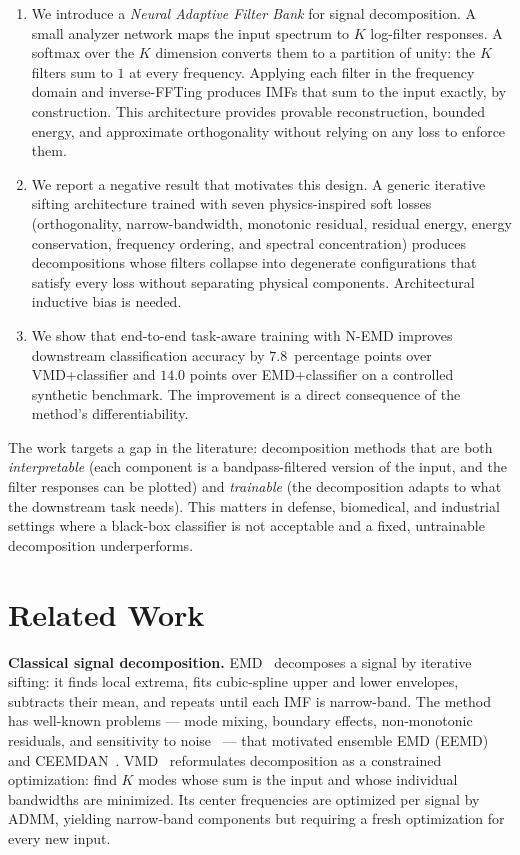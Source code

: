 \documentclass[journal]{IEEEtran}
\begin{document}
\begin{enumerate}
\item We introduce a \emph{Neural Adaptive Filter Bank} for signal decomposition. A small analyzer network maps the input spectrum to $K$ log-filter responses. A softmax over the $K$ dimension converts them to a partition of unity: the $K$ filters sum to $1$ at every frequency. Applying each filter in the frequency domain and inverse-FFTing produces IMFs that sum to the input exactly, by construction. This architecture provides provable reconstruction, bounded energy, and approximate orthogonality without relying on any loss to enforce them.
\item We report a negative result that motivates this design. A generic iterative sifting architecture trained with seven physics-inspired soft losses (orthogonality, narrow-bandwidth, monotonic residual, residual energy, energy conservation, frequency ordering, and spectral concentration) produces decompositions whose filters collapse into degenerate configurations that satisfy every loss without separating physical components. Architectural inductive bias is needed.
\item We show that end-to-end task-aware training with N-EMD improves downstream classification accuracy by $7.8$~percentage points over VMD+classifier and $14.0$ points over EMD+classifier on a controlled synthetic benchmark. The improvement is a direct consequence of the method's differentiability.
\end{enumerate}

The work targets a gap in the literature: decomposition methods that are both \emph{interpretable} (each component is a bandpass-filtered version of the input, and the filter responses can be plotted) and \emph{trainable} (the decomposition adapts to what the downstream task needs). This matters in defense, biomedical, and industrial settings where a black-box classifier is not acceptable and a fixed, untrainable decomposition underperforms.

\section{Related Work}
\label{sec:related}

\textbf{Classical signal decomposition.} EMD~\cite{huang1998} decomposes a signal by iterative sifting: it finds local extrema, fits cubic-spline upper and lower envelopes, subtracts their mean, and repeats until each IMF is narrow-band. The method has well-known problems --- mode mixing, boundary effects, non-monotonic residuals, and sensitivity to noise~\cite{rilling2003emd} --- that motivated ensemble EMD (EEMD)~\cite{wu2009eemd} and CEEMDAN~\cite{torres2011ceemdan}. VMD~\cite{vmd2014} reformulates decomposition as a constrained optimization: find $K$ modes whose sum is the input and whose individual bandwidths are minimized. Its center frequencies are optimized per signal by ADMM, yielding narrow-band components but requiring a fresh optimization for every new input.
\end{document}
